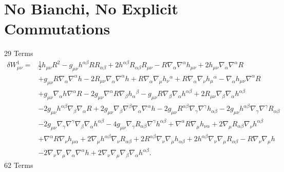 \documentclass[10pt,letterpaper]{article}
\begin{document}
\section*{No Bianchi, No Explicit Commutations}
29 Terms
\begin{align}
\delta W^1_{\mu\nu}={}&\tfrac{1}{2} h_{\mu \nu} R^2
 -  g_{\mu \nu} h^{\alpha \beta} R R_{\alpha \beta}
 + 2 h^{\alpha \beta} R_{\alpha \beta} R_{\mu \nu}
 -  R \nabla_{\alpha}\nabla^{\alpha}h_{\mu \nu}
 + 2 h_{\mu \nu} \nabla_{\alpha}\nabla^{\alpha}R\nonumber\\
& + g_{\mu \nu} R \nabla_{\alpha}\nabla^{\alpha}h
 - 2 R_{\mu \nu} \nabla_{\alpha}\nabla^{\alpha}h
 + R \nabla_{\alpha}\nabla_{\mu}h_{\nu}{}^{\alpha}
 + R \nabla_{\alpha}\nabla_{\nu}h_{\mu}{}^{\alpha}
 -  \nabla_{\alpha}h_{\mu \nu} \nabla^{\alpha}R\nonumber\\
& + g_{\mu \nu} \nabla_{\alpha}h \nabla^{\alpha}R
 - 2 g_{\mu \nu} \nabla^{\alpha}R \nabla_{\beta}h_{\alpha}{}^{\beta}
 -  g_{\mu \nu} R \nabla_{\beta}\nabla_{\alpha}h^{\alpha \beta}
 + 2 R_{\mu \nu} \nabla_{\beta}\nabla_{\alpha}h^{\alpha \beta}\nonumber\\
& - 2 g_{\mu \nu} h^{\alpha \beta} \nabla_{\beta}\nabla_{\alpha}R
 + 2 g_{\mu \nu} \nabla_{\beta}\nabla^{\beta}\nabla_{\alpha}\nabla^{\alpha}h
 - 2 g_{\mu \nu} R^{\alpha \beta} \nabla_{\gamma}\nabla^{\gamma}h_{\alpha \beta}
 - 2 g_{\mu \nu} h^{\alpha \beta} \nabla_{\gamma}\nabla^{\gamma}R_{\alpha \beta}\nonumber\\
& - 2 g_{\mu \nu} \nabla_{\gamma}\nabla^{\gamma}\nabla_{\beta}\nabla_{\alpha}h^{\alpha \beta}
 - 4 g_{\mu \nu} \nabla_{\gamma}R_{\alpha \beta} \nabla^{\gamma}h^{\alpha \beta}
 + \nabla^{\alpha}R \nabla_{\mu}h_{\nu \alpha}
 + 2 \nabla_{\mu}R_{\alpha \beta} \nabla_{\nu}h^{\alpha \beta}\nonumber\\
& + \nabla^{\alpha}R \nabla_{\nu}h_{\mu \alpha}
 + 2 \nabla_{\mu}h^{\alpha \beta} \nabla_{\nu}R_{\alpha \beta}
 + 2 R^{\alpha \beta} \nabla_{\nu}\nabla_{\mu}h_{\alpha \beta}
 + 2 h^{\alpha \beta} \nabla_{\nu}\nabla_{\mu}R_{\alpha \beta}
 -  R \nabla_{\nu}\nabla_{\mu}h\nonumber\\
& - 2 \nabla_{\nu}\nabla_{\mu}\nabla_{\alpha}\nabla^{\alpha}h
 + 2 \nabla_{\nu}\nabla_{\mu}\nabla_{\beta}\nabla_{\alpha}h^{\alpha \beta}.
\end{align}
62 Terms
\end{document}
